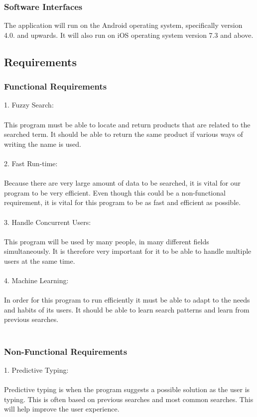 \documentclass[a4paper,10pt]{article}
\begin{document}
                 \subsubsection{Software Interfaces}
The application will run on the Android operating system, specifically version 4.0. and upwards. It will also run on iOS operating system version 7.3 and above.

	\subsection{Requirements}
	\subsubsection{Functional Requirements} 
	1.	Fuzzy Search:\\\\
	This program must be able to locate and return products that are related to the searched term. It should be able to return the 	same product if various ways of writing the name is used.\\\\
	
	2.	Fast Run-time:\\\\
	Because there are very large amount of data to be searched, it is vital for our program to be very efficient.  Even though this could be a non-functional requirement, it is vital for this program to be as fast and efficient as possible.\\\\
	
	3.	Handle Concurrent Users:\\\\
	This program will be used by many people, in many different fields simultaneously. It is therefore very important for it to be able to handle multiple users at the same time.\\\\
	
	4.	Machine Learning:\\\\
	In order for this program to run efficiently it must be able to adapt to the needs and habits of its users. It should be able to learn search patterns and learn from previous searches.\\\\
	\subsubsection{Non-Functional Requirements}
	1.	Predictive Typing:\\\\
	Predictive typing is when the program suggests a possible solution as the user is typing. This is often based on previous searches and most common searches. This will help improve the user experience. \\\\
\end{document}
